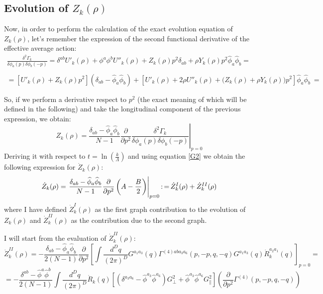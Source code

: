 \subsection{Evolution of $Z_k(\rho)$}
Now, in order to perform the calculation of the exact evolution equation of $ Z_k(\rho)$, let's remember the expression of the second functional derivative of the effective average action:
\begin{displaymath}\label{G2}
\left.
\begin{array}{l}
 \frac{\delta^2 \Gamma_{k}}{\delta\phi_a(p)\delta\phi_b(-p)} =  \delta^{ab}U'_k(\rho) + \phi^a\phi^bU''_k(\rho)+ Z_k(\rho) p^2 \delta_{ab} + \rho Y_k(\rho) p^2\widehat{\phi}_a\widehat{\phi}_b  = \\ \\
 = \left[U'_k(\rho) +  Z_k(\rho)p^2\right](\delta_{ab} - \widehat{\phi}_a\widehat{\phi}_b) + \left[U'_k(\rho) + 2\rho U''_k(\rho) + \big(Z_k(\rho) + \rho Y_k(\rho)\big)p^2\right]\widehat{\phi}_a\widehat{\phi}_b\ = \\ \\ 
 \end{array}
\right.
\end{displaymath}
So, if we perform a derivative respect to $p^2$ (the exact meaning of which will be defined in the following) and take the 
longitudinal component of the previous expression, we obtain:
\begin{equation}\label{(42)}
 Z_k(\rho) = \left. \frac{\delta_{ab} - \widehat{\phi}_a\widehat{\phi}_b}{N-1} \frac{\partial}{\partial p^2} \frac{\delta^2 \Gamma_{k}}{\delta\phi_a(p)\delta\phi_b(-p)}\right|_{p = 0} 
\end{equation}
Deriving it with respect to $t = \ln\left(\frac{k}{\Lambda}\right)$ and using equation \eqref{G2} we obtain the following expression for $\dot{Z}_k(\rho)$:
$$\dot{Z}_k(\rho) = \left. \frac{\delta_{ab} - \widehat{\phi}_a\widehat{\phi}_b}{N-1} \frac{\partial}{\partial p^2}     \left(A - \frac{B}{2}\right)        \right|_{p = 0} \operatorname{:=} \dot{Z}^I_k(\rho) + \dot{Z}^{II}_k(\rho)$$
where I have defined $\dot{Z}^I_k(\rho)$ as the first graph contribution to the evolution of $Z_k(\rho)$ and $\dot{Z}^{II}_k(\rho)$ as the contribution due to the second graph. 

I will start from the evaluation of $\dot{Z}^{II}_k(\rho)$:
\begin{equation*}
 \dot{Z}^{II}_k(\rho) = -\frac{\delta_{ab} - \widehat{\phi}_a\widehat{\phi}_b}{2(N-1)} \frac{\partial}{\partial p^2}\left[\int \frac{d^Dq}{(2\pi)^D}G^{a_1a_3}(q)\Gamma^{(4)aba_3a_6}(p, -p, q, -q) G^{a_1a_3}(q)\dot{R}^{a_2a_1}_k(q)\right]_{p=0} = 
\end{equation*}
\begin{equation}\label{zetapunto2}
= -\frac{\delta^{ab} - \widehat{\phi}^a\widehat{\phi}^b}{2(N- 1)}\int \frac{d^Dq}{(2\pi)^D}\dot{R}_k(q)\left[(\delta^{a_3a_6} - \widehat{\phi}^{a_3}\widehat{\phi}^{a_6})G_{\perp}^2 + \widehat{\phi}^{a_3}\widehat{\phi}^{a_6}G_{\parallel}^2 \right]\left(\frac{\partial}{\partial p^2}\Gamma^{(4)}(p,-p,q,-q)\right)
\end{equation}

